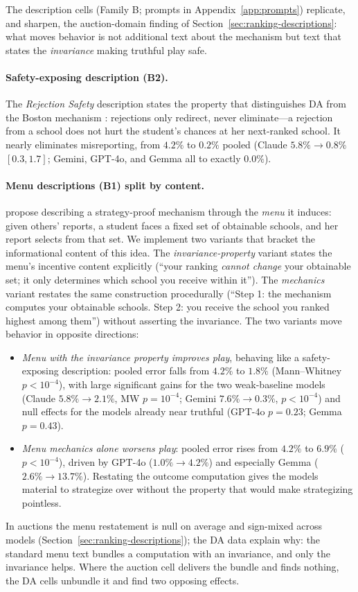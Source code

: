 The description cells (Family B; prompts in Appendix~\ref{app:prompts}) replicate, and sharpen, the auction-domain finding of Section~\ref{sec:ranking-descriptions}: what moves behavior is not additional text about the mechanism but text that states the \emph{invariance} making truthful play safe.

\paragraph{Safety-exposing description (B2).} The \emph{Rejection Safety} description states the property that distinguishes DA from the Boston mechanism \citep{abdulkadirouglu2003school}: rejections only redirect, never eliminate---a rejection from a school does not hurt the student's chances at her next-ranked school. It nearly eliminates misreporting, from $4.2\%$ to $0.2\%$ pooled (Claude $5.8\% \to 0.8\%$ $[0.3, 1.7]$; Gemini, GPT-4o, and Gemma all to exactly $0.0\%$).

\paragraph{Menu descriptions (B1) split by content.} \citet{gonczarowski2023strategyproofness} propose describing a strategy-proof mechanism through the \emph{menu} it induces: given others' reports, a student faces a fixed set of obtainable schools, and her report selects from that set. We implement two variants that bracket the informational content of this idea. The \emph{invariance-property} variant states the menu's incentive content explicitly (``your ranking \emph{cannot change} your obtainable set; it only determines which school you receive within it''). The \emph{mechanics} variant restates the same construction procedurally (``Step 1: the mechanism computes your obtainable schools. Step 2: you receive the school you ranked highest among them'') without asserting the invariance. The two variants move behavior in opposite directions:
\begin{itemize}
    \item \emph{Menu with the invariance property improves play}, behaving like a safety-exposing description: pooled error falls from $4.2\%$ to $1.8\%$ (Mann--Whitney $p < 10^{-4}$), with large significant gains for the two weak-baseline models (Claude $5.8\% \to 2.1\%$, MW $p = 10^{-4}$; Gemini $7.6\% \to 0.3\%$, $p < 10^{-4}$) and null effects for the models already near truthful (GPT-4o $p = 0.23$; Gemma $p = 0.43$).
    \item \emph{Menu mechanics alone worsens play}: pooled error rises from $4.2\%$ to $6.9\%$ ($p < 10^{-4}$), driven by GPT-4o ($1.0\% \to 4.2\%$) and especially Gemma ($2.6\% \to 13.7\%$). Restating the outcome computation gives the models material to strategize over without the property that would make strategizing pointless.
\end{itemize}
In auctions the menu restatement is null on average and sign-mixed across models (Section~\ref{sec:ranking-descriptions}); the DA data explain why: the standard menu text bundles a computation with an invariance, and only the invariance helps. Where the auction cell delivers the bundle and finds nothing, the DA cells unbundle it and find two opposing effects.

